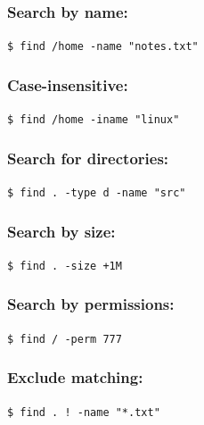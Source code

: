 \documentclass[12pt]{article}
\begin{document}
\subsubsection*{Search by name:}

\begin{highlightbox}
\texttt{\$ find /home -name "notes.txt"}
\end{highlightbox}

\subsubsection*{Case-insensitive:}

\begin{highlightbox}
\texttt{\$ find /home -iname "linux"}
\end{highlightbox}

\subsubsection*{Search for directories:}

\begin{highlightbox}
\texttt{\$ find . -type d -name "src"}
\end{highlightbox}

\subsubsection*{Search by size:}

\begin{highlightbox}
\texttt{\$ find . -size +1M}
\end{highlightbox}

\subsubsection*{Search by permissions:}

\begin{highlightbox}
\texttt{\$ find / -perm 777}
\end{highlightbox}

\subsubsection*{Exclude matching:}

\begin{highlightbox}
\texttt{\$ find . ! -name "*.txt"}
\end{highlightbox}
\end{document}
